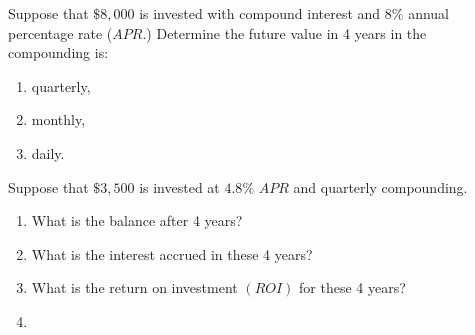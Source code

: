 \begin{homeworkProblem}
    Suppose that $\$8,000$ is invested with compound interest and $8\%$ annual percentage rate ($APR$.) Determine the future value in 4 years in the compounding is:
    \begin{enumerate}[label=\roman*)]
        \item  quarterly,
        \item monthly,
        \item daily.
    \end{enumerate}

\end{homeworkProblem}
\begin{homeworkProblem}
Suppose that $\$3,500$ is invested at $4.8\%$ $APR$ and quarterly compounding.
    \begin{enumerate}[label=\roman*)]
        \item What is the balance after 4 years?
        \item What is the interest accrued in these 4 years?
        \item What is the return on investment $(ROI)$ for these 4 years?
        \item 
    \end{enumerate}

\end{homeworkProblem}

\begin{homeworkProblem}
\end{homeworkProblem}

\begin{homeworkProblem}
\end{homeworkProblem}

\begin{homeworkProblem}
\end{homeworkProblem}

\begin{homeworkProblem}
\end{homeworkProblem}

\begin{homeworkProblem}
\end{homeworkProblem}

\begin{homeworkProblem}
\end{homeworkProblem}

\begin{homeworkProblem}
\end{homeworkProblem}



